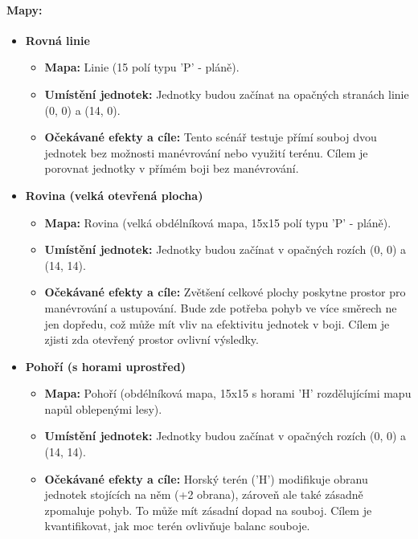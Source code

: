\paragraph{Mapy:}
\begin{itemize}
    \item \textbf{Rovná linie}
        \begin{itemize}
            \item \textbf{Mapa:} Linie (15 polí typu 'P' - pláně).
            \item \textbf{Umístění jednotek:} Jednotky budou začínat na opačných stranách linie (0, 0) a (14, 0).
            \item \textbf{Očekávané efekty a cíle:} Tento scénář testuje přímí souboj dvou jednotek bez možnosti manévrování nebo využití terénu. Cílem je porovnat jednotky v přímém boji bez manévrování.
        \end{itemize}
    \item \textbf{Rovina (velká otevřená plocha)}
        \begin{itemize}
            \item \textbf{Mapa:} Rovina (velká obdélníková mapa, 15x15 polí typu 'P' - pláně).
            \item \textbf{Umístění jednotek:} Jednotky budou začínat v opačných rozích (0, 0) a (14, 14).
            \item \textbf{Očekávané efekty a cíle:} Zvětšení celkové plochy poskytne prostor pro manévrování a ustupování.  Bude zde potřeba pohyb ve více směrech ne jen dopředu, což může mít vliv na efektivitu jednotek v boji. Cílem je zjisti zda otevřený prostor ovlivní výsledky.
        \end{itemize}
    \item \textbf{Pohoří (s horami uprostřed)}
        \begin{itemize}
            \item \textbf{Mapa:} Pohoří (obdélníková mapa, 15x15 s horami 'H' rozdělujícími mapu napůl oblepenými lesy).
            \item \textbf{Umístění jednotek:} Jednotky budou začínat v opačných rozích (0, 0) a (14, 14).
            \item \textbf{Očekávané efekty a cíle:} Horský terén ('H') modifikuje obranu jednotek stojících na něm (+2 obrana), zároveň ale také zásadně zpomaluje pohyb. To může mít zásadní dopad na souboj. Cílem je kvantifikovat, jak moc terén ovlivňuje balanc souboje.
        \end{itemize}
\end{itemize}


